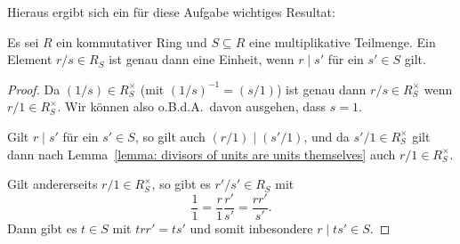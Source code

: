 \documentclass[a4paper,10pt,numbers=noenddot]{scrartcl}
\begin{document}
Hieraus ergibt sich ein für diese Aufgabe wichtiges Resultat:

\begin{claim}
  \label{claim: divisors become units in the localization}
  Es sei $R$ ein kommutativer Ring und $S \subseteq R$ eine multiplikative Teilmenge.
  Ein Element $r/s \in R_S$ ist genau dann eine Einheit, wenn $r \mid s'$ für ein $s' \in S$ gilt.
\end{claim}
\begin{proof}
  Da $(1/s) \in R_S^{\times}$ (mit $(1/s)^{-1} = (s/1)$) ist genau dann $r/s \in R_S^\times$ wenn $r/1 \in R_S^\times$.
  Wir können also o.B.d.A.\ davon ausgehen, dass $s = 1$.
  
  Gilt $r \mid s'$ für ein $s' \in S$, so gilt auch $(r/1) \mid (s'/1)$, und da $s'/1 \in R_S^{\times}$ gilt dann nach Lemma~\ref{lemma: divisors of units are units themselves} auch $r/1 \in R_S^{\times}$.
  
  Gilt andererseits $r/1 \in R_S^\times$, so gibt es $r'/s' \in R_S$ mit
  \[
      \frac{1}{1}
    = \frac{r}{1} \frac{r'}{s'}
    = \frac{r r'}{s'}.
  \]
  Dann gibt es $t \in S$ mit $t r r' = t s'$ und somit inbesondere $r \mid t s' \in S$.
\end{proof}
\end{document}
